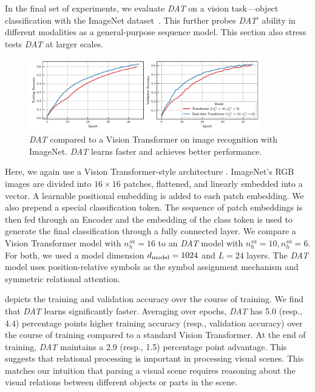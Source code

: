In the final set of experiments, we evaluate \textit{DAT} on a vision task---object classification with the ImageNet dataset~\citep{imagenet}. This further probes \textit{DAT}' ability in different modalities as a general-purpose sequence model. This section also stress tests \textit{DAT} at larger scales.

\begin{figure}[ht]
    \centering
    \includegraphics[width=0.9\textwidth]{figs/experiments/imagenet/imagenet_acc_curves.pdf}
    \caption{\textit{DAT} compared to a Vision Transformer on image recognition with ImageNet. \textit{DAT} learns faster and achieves better performance.}\label{fig:vision_acc_curve}
\end{figure}

Here, we again use a Vision Transformer-style architecture \citep{dosovitskiyImageWorth16x162020}. ImageNet's RGB images are divided into $16 \times 16$ patches, flattened, and linearly embedded into a vector. A learnable positional embedding is added to each patch embedding. We also prepend a special classification token. The sequence of patch embeddings is then fed through an Encoder and the embedding of the class token is used to generate the final classification through a fully connected layer. We compare a Vision Transformer model with $n_h^{sa} = 16$ to an \textit{DAT} model with $n_h^{sa} = 10, n_h^{sa} = 6$. For both, we used a model dimension $d_{\mathrm{model}} = 1024$ and $L = 24$ layers. The \textit{DAT} model uses position-relative symbols as the symbol assignment mechanism and symmetric relational attention.

 depicts the training and validation accuracy over the course of training. We find that \textit{DAT} learns significantly faster. Averaging over epochs, \textit{DAT} has 5.0 (resp., 4.4) percentage points higher training accuracy (resp., validation accuracy) over the course of training compared to a standard Vision Transformer. At the end of training, \textit{DAT} maintains a 2.9 (resp., 1.5) percentage point advantage. This suggests that relational processing is important in processing visual scenes. This matches our intuition that parsing a visual scene requires reasoning about the visual relations between different objects or parts in the scene.



